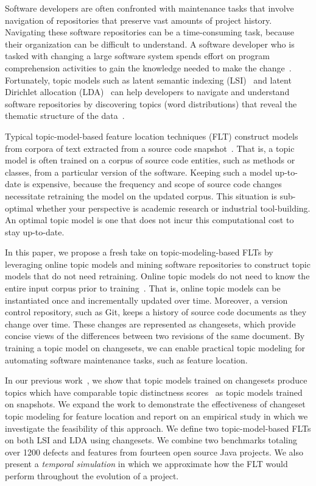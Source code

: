
Software developers are often confronted with maintenance tasks that involve navigation of repositories that preserve vast amounts of project history.
Navigating these software repositories can be a time-consuming task, because their organization can be difficult to understand.
A software developer who is tasked with changing a large software system spends effort on program comprehension activities to gain the knowledge needed to make the change~\cite{Corbi:1989}.
Fortunately, topic models such as
latent semantic indexing (LSI)~\cite{Deerwester-etal:1990} and
latent Dirichlet allocation (LDA)~\cite{Blei-etal:2003}
can help developers to navigate and understand software repositories
by discovering topics (word distributions) that reveal the thematic structure
of the data~\cite{Linstead-etal:2007,Thomas-etal:2011,Hindle-etal:2012}.

Typical topic-model-based feature location techniques (FLT) construct models from corpora of text extracted from a source code snapshot~\cite{Dit-etal:2013b}.
That is, a topic model is often trained on a corpus of source code entities, such as methods or classes, from a particular version of the software.
Keeping such a model up-to-date is expensive, because the frequency and scope of source code changes necessitate retraining the model on the updated corpus.
This situation is sub-optimal whether your perspective is academic research or industrial tool-building.
An optimal topic model is one that does not incur this computational cost to stay up-to-date.

In this paper, we propose a fresh take on topic-modeling-based FLTs by leveraging online topic models and mining software repositories to construct topic models that do not need retraining.
Online topic models do not need to know the entire input corpus prior to training~\cite{Hoffman-etal:2010,Radim:2011}.
That is, online topic models can be instantiated once and incrementally updated over time.
Moreover, a version control repository, such as Git, keeps a history of source code documents as they change over time.
These changes are represented as changesets, which provide concise views of the differences between two revisions of the same document.
By training a topic model on changesets, we can enable practical topic modeling for automating software maintenance tasks, such as feature location.

In our previous work~\cite{Corley-etal:2014}, we show that topic models trained on changesets produce topics which have comparable
topic distinctness scores~\cite{Thomas-etal:2011} as topic models trained on snapshots.
We expand the work to demonstrate the effectiveness of changeset topic modeling for feature location and report on an empirical study in which we investigate the feasibility of this approach.
We define two topic-model-based FLTs on both LSI and LDA using changesets.
We combine two benchmarks totaling over 1200 defects and features from fourteen open source Java projects.
We also present a \emph{temporal simulation} in which we approximate how the FLT would perform throughout the evolution of a project.

